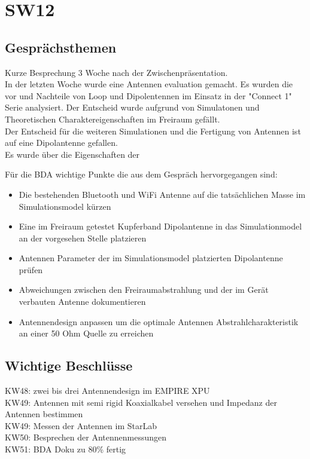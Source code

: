 \documentclass[10pt,a4paper]{article}
\begin{document}
\section*{SW12}

\subsection*{Gesprächsthemen}

Kurze Besprechung 3 Woche nach der Zwischenpräsentation.\\


In der letzten Woche wurde eine Antennen evaluation gemacht. Es wurden die vor und Nachteile von Loop und Dipolentennen im Einsatz in der "Connect 1" Serie analysiert. Der Entscheid wurde aufgrund von Simulatonen und Theoretischen Charaktereigenschaften im Freiraum gefällt. \\
Der Entscheid für die weiteren Simulationen und die Fertigung von Antennen ist auf eine Dipolantenne gefallen.\\
Es wurde über die Eigenschaften der

\vspace{10 mm}
Für die BDA wichtige Punkte die aus dem Gespräch hervorgegangen sind:
\begin{itemize}
	\item Die bestehenden Bluetooth und WiFi Antenne auf die tatsächlichen Masse im Simulationsmodel kürzen
\item Eine im Freiraum getestet Kupferband Dipolantenne in das Simulationmodel an der vorgesehen Stelle platzieren
\item Antennen Parameter der im Simulationsmodel platzierten Dipolantenne prüfen
\item Abweichungen zwischen den Freiraumabstrahlung und der im Gerät verbauten Antenne dokumentieren
\item Antennendesign anpassen um die optimale Antennen Abstrahlcharakteristik an einer 50 Ohm Quelle zu erreichen
		
\end{itemize}

\subsection*{Wichtige Beschlüsse}
KW48: zwei bis drei Antennendesign im EMPIRE XPU \\
KW49: Antennen mit semi rigid Koaxialkabel versehen und Impedanz der Antennen bestimmen\\
KW49: Messen der Antennen im StarLab\\
KW50: Besprechen der Antennenmessungen\\
KW51: BDA Doku zu 80\% fertig\\
\end{document}
